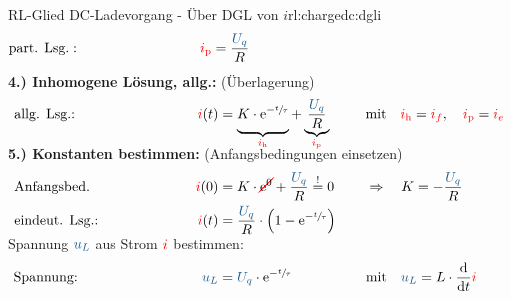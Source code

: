 \begin{frame}[t]
{\begin{bsp}{RL-Glied DC-Ladevorgang - Über DGL von $i$}{rl:chargedc:dgli}
\begin{align*}
        &\text{part. Lsg.}:&&&
            \eci{i_{\mathrm p}} &= \frac{\ecv{U_q}}{R}
        \\[-15pt]&\hphantom{R1oooooooooo}&&&\hphantom{L3ooooooooooo}&\hphantom{R3ooooooooooooooo}&&&&\hphantom{R5oooooooooooooooooo}\nonumber%
    \end{align*}%
    \textbf{4.) Inhomogene Lösung, allg.:} (Überlagerung)%
    \begin{align*}%
        &\text{allg. Lsg.:}&&&
            \eci{i}(t) &=
            \underbrace{%
                K \cdot \mathrm{e}^{-\sfrac{t}{\tau}} \vphantom{\frac{\ecv{U_q}}{R}}%
            }_{\eci{i_{\mathrm h}}}
            +
            \underbrace{
                \frac{\ecv{U_q}}{R}
            }_{\eci{i_{\mathrm p}}} &&&
            &\text{mit}\quad \eci{i_{\mathrm h}}=\eci{i_f},\quad \eci{i_{\mathrm p}}=\eci{i_e}
        \\[-15pt]&\hphantom{R1oooooooooo}&&&\hphantom{L3ooooooooooo}&\hphantom{R3ooooooooooooooo}&&&&\hphantom{R5oooooooooooooooooo}\nonumber%
        \end{align*}%
    \textbf{5.) Konstanten bestimmen:} (Anfangsbedingungen einsetzen)%
    \begin{align*}%
        &\text{Anfangsbed.}&&&
            \eci{i}(0) &= K \cdot \redcancel{\mathrm{e}^0} + \frac{\ecv{U_q}}{R} \overset{!}{=} 0 &&&
            &\Rightarrow\quad K = -\frac{\ecv{U_q}}{R}\\
        &\text{eindeut. Lsg.:}&&&
            \eci{i}(t) &= \frac{\ecv{U_q}}{R} \cdot \left( 1 - \mathrm{e}^{-\sfrac{t}{\tau}} \right)
        \\[-15pt]&\hphantom{R1oooooooooo}&&&\hphantom{L3ooooooooooo}&\hphantom{R3ooooooooooooooo}&&&&\hphantom{R5oooooooooooooooooo}\nonumber%
    \end{align*}%
    Spannung $\ecv{u_L}$ aus Strom ${\color{red}i}$ bestimmen:%
    \begin{align*}%
        &\text{Spannung:}&&&
            \ecv{u_L} &= \ecv{U_q} \cdot \mathrm{e}^{-\sfrac{t}{\tau}} &&&
            &\text{mit}\quad \ecv{u_L} = L \cdot \frac{\mathrm{d}}{\mathrm{d}t} \eci{i}
        \\[-15pt]&\hphantom{R1oooooooooo}&&&\hphantom{L3ooooooooooo}&\hphantom{R3ooooooooooooooo}&&&&\hphantom{R5oooooooooooooooooo}\nonumber%
    \end{align*}
    \endgroup
\end{bsp}
}%


\end{frame}
